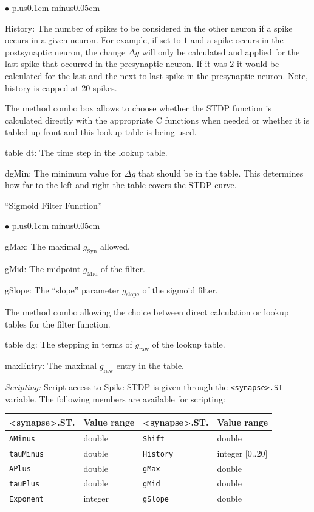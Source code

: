 \documentclass{article}
\newenvironment{myitem}{\begin{list}{$\bullet$}{\setlength{\leftmargin}{1.1em}
\itemsep0.1cm plus0.1cm minus0.05cm
\listparindent0cm
\addtolength{\labelsep}{0.5\labelsep}
\setlength{\labelwidth}{0.8em}
\setlength{\leftmargin}{\labelwidth}
\addtolength{\leftmargin}{\labelsep}
}}{\end{list}}
\begin{document}
\begin{myitem}
\item History: The number of spikes to be considered in the other
  neuron if a spike occurs in a given neuron. For example, if set to
  $1$ and a spike occurs in the postsynaptic neuron, the change 
  $\Delta g$ will only be calculated and applied for the last spike
  that occurred in the presynaptic neuron. If it was $2$ it would be
  calculated for the last and the next to last spike in the
  presynaptic neuron. Note, history is capped at 20 spikes.
\item The method combo box allows to choose whether the STDP function is
  calculated directly with the appropriate C functions when needed or
  whether it is tabled up front and this lookup-table is being used.
\item table dt: The time step in the lookup table.
\item dgMin: The minimum value for $\Delta g$ that should be in the
  table. This determines how far to the left and right the table
  covers the STDP curve.
\end{myitem}
``Sigmoid Filter Function''
\begin{myitem}
\item gMax: The maximal $g_{\text{Syn}}$ allowed.
\item gMid: The midpoint $g_{\text{Mid}}$ of the filter.
\item gSlope: The ``slope'' parameter $g_{\text{slope}}$ of the sigmoid filter. 
\item The method combo allowing the choice between direct calculation
  or lookup tables for the filter function.
\item table dg: The stepping in terms of $g_{\text{raw}}$ of the
  lookup table.
\item maxEntry: The maximal $g_{\text{raw}}$ entry in the table.
\end{myitem}

\noindent
\emph{Scripting:} Script access to Spike STDP is given through the \texttt{<synapse>.ST} variable.
The following members are available for scripting: \\
\begin{tabular}[b]{|ll|ll|}
	\hline
	{\bf \textless{}synapse\textgreater.ST.\textvisiblespace} & {\bf Value range} 
	& {\bf \textless{}synapse\textgreater.ST.\textvisiblespace} & {\bf Value range} \\
	\hline
	\texttt{AMinus} & double 	& \texttt{Shift} & double \\
	\texttt{tauMinus} & double 	& \texttt{History} & integer [0..20] \\
	\texttt{APlus} & double 	& \texttt{gMax} & double \\
	\texttt{tauPlus} & double & \texttt{gMid} & double \\
	\texttt{Exponent} & integer & \texttt{gSlope} & double \\
	\hline
\end{tabular}\\
\end{document}
